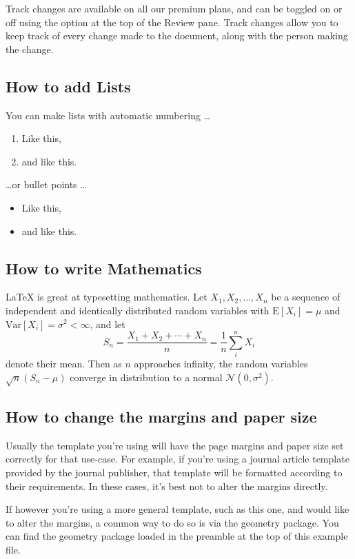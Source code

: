 \documentclass{article}
\begin{document}
Track changes are available on all our premium plans, and can be toggled on or off using the option at the top of the Review pane. Track changes allow you to keep track of every change made to the document, along with the person making the change.

\subsection{How to add Lists}

You can make lists with automatic numbering \dots

\begin{enumerate}
\item Like this,
\item and like this.
\end{enumerate}
\dots or bullet points \dots
\begin{itemize}
\item Like this,
\item and like this.
\end{itemize}

\subsection{How to write Mathematics}

\LaTeX{} is great at typesetting mathematics. Let $X_1, X_2, \ldots, X_n$ be a sequence of independent and identically distributed random variables with $\text{E}[X_i] = \mu$ and $\text{Var}[X_i] = \sigma^2 < \infty$, and let
\[S_n = \frac{X_1 + X_2 + \cdots + X_n}{n}
      = \frac{1}{n}\sum_{i}^{n} X_i\]
denote their mean. Then as $n$ approaches infinity, the random variables $\sqrt{n}(S_n - \mu)$ converge in distribution to a normal $\mathcal{N}(0, \sigma^2)$.


\subsection{How to change the margins and paper size}

Usually the template you're using will have the page margins and paper size set correctly for that use-case. For example, if you're using a journal article template provided by the journal publisher, that template will be formatted according to their requirements. In these cases, it's best not to alter the margins directly.

If however you're using a more general template, such as this one, and would like to alter the margins, a common way to do so is via the geometry package. You can find the geometry package loaded in the preamble at the top of this example file.
\end{document}
